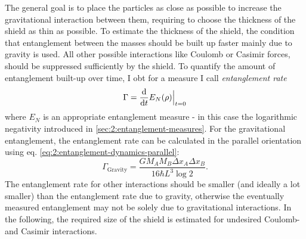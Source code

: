 The general goal is to place the particles as close as possible to increase the gravitational interaction between them, requiring to choose the thickness of the shield as thin as possible.
To estimate the thickness of the shield, the condition that entanglement between the masses should be built up faster mainly due to gravity is used.
All other possible interactions like Coulomb or Casimir forces, should be suppressed sufficiently by the shield.
To quantify the amount of entanglement built-up over time, I obt for a measure I call \emph{entanglement rate}
\begin{equation}\label{eq:5:entanglement-rate}
  \Gamma = \dv{t} E_N(\rho)\Big|_{t=0}
\end{equation} 
where $E_N$ is an appropriate entanglement measure - in this case the logarithmic negativity \cite{Plenio_2005} introduced in \cref{sec:2:entanglement-measures}.
For the gravitational entanglement, the entanglement rate can be calculated in the parallel orientation using eq. \eqref{eq:2:entanglement-dynamics-parallel}:
\begin{equation}\label{eq:5:entanglement-rate-gravity}
  \Gamma_\mathrm{Gravity} = \frac{G M_A M_B \Delta x_A \Delta x_B}{16 \hbar L^3 \log 2} .
\end{equation}
The entanglement rate for other interactions should be smaller (and ideally a lot smaller) than the entanglement rate due to gravity, otherwise the eventually measured entanglement may not be solely due to gravitational interactions.
In the following, the required size of the shield is estimated for undesired Coulomb- and Casimir interactions.

